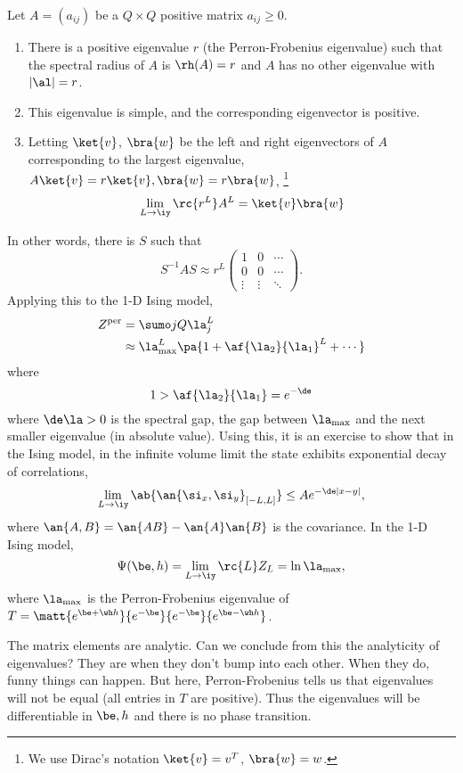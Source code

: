 \begin{thm}
Let $A=(a_{ij})$ be a $Q\times Q$ positive matrix $a_{ij}\ge 0$. 
\begin{enumerate}
\item
There is a positive eigenvalue $r$ (the Perron-Frobenius eigenvalue) such that the spectral radius of $A$ is $\rh(A)=r$ and $A$ has no other eigenvalue with $|\al|=r$.
\item
This eigenvalue is simple, and the corresponding eigenvector is positive.
\item Letting $\ket{v}$, $\bra{w}$ be the left and right eigenvectors of $A$ corresponding to the largest eigenvalue, $A\ket{v}=r\ket{v}, \bra{w} = r \bra{w}$,
\footnote{We use Dirac's notation $\ket{v}=v^T$, $\bra{w}=w$.}
\[
\lim_{L\to \iy} \rc{r^L}A^L = \ket{v}\bra{w}
\]
\end{enumerate}
\end{thm}
In other words, there is $S$ such that 
\[S^{-1}AS\approx r^L\begin{pmatrix}
1&0&\cdots\\
0&0&\cdots\\
\vdots &\vdots &\ddots
\end{pmatrix}.\]
Applying this to the 1-D Ising model,
\begin{align}
Z^{\text{per}} &=
\sumo jQ \la_j^L\\
& \approx \la_{\max}^L \pa{1+\af{\la_2}{\la_1}^L +\cdots}
\end{align}
where 
\[
1>\af{\la_2}{\la_1} = e^{-\de}
\]
where $\de\la>0$ is the spectral gap, the gap between $\la_{\max}$ and the next smaller eigenvalue (in absolute value).
Using this, it is an exercise to show that in the Ising model, in the infinite volume limit the state exhibits exponential decay of correlations,
\[
\lim_{L\to \iy} \ab{\an{\si_x,\si_y}_{[-L,L]}} \le Ae^{-\de |x-y|},
\]
where $\an{A,B}=\an{AB}-\an{A}\an{B}$ is the covariance.
In the 1-D Ising model,
\[
\Psi(\be,h)=\lim_{L\to \iy} \rc{L}Z_L= \ln \la_{\max},
\]
where $\la_{\max}$ is the Perron-Frobenius eigenvalue of $T=\matt{e^{\be+\wh h}}{e^{-\be}}{e^{-\be}}{e^{\be-\wh h}}$.

The matrix elements are analytic. Can we conclude from this the analyticity of eigenvalues? They are when they don't bump into each other. When they do, funny things can happen. But here, Perron-Frobenius tells us that eigenvalues will not be equal (all entries in $T$ are positive). Thus the eigenvalues will be differentiable in $\be,h$ and there is no phase transition.

